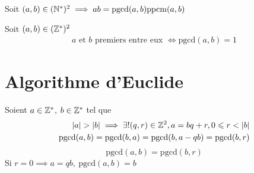 \begin{theoreme}
Soit $(a, b) \in (\mathbb{N}^*)^2 \implies ab = \mathrm{pgcd}(a, b)\mathrm{ppcm}(a, b)$
\end{theoreme}

\begin{definition}
	Soit $(a, b) \in (\mathbb{Z}^*)^2$
	\begin{align*}
	a \text{ et } b \text{ premiers entre eux } \iff \mathrm{pgcd}(a, b) = 1
	\end{align*}
\end{definition}

\section{Algorithme d'Euclide}
\begin{proposition}
Soient $a \in \mathbb{Z}^*$, $b \in \mathbb{Z}^*$ tel que 
\begin{align*}
|a| > |b| \implies \exists ! (q, r) \in \mathbb{Z}^2, a = b q + r, 0 \leqslant r < |b| \\
\mathrm{pgcd}(a, b) = \mathrm{pgcd}(b, a) = \mathrm{pgcd}(b, a - qb) = \mathrm{pgcd}(b, r) \\
\end{align*}
\begin{equation*}
\mathrm{pgcd}(a, b) = \mathrm{pgcd}(b, r)
\end{equation*}
Si $r = 0 \implies a = q b,\ \mathrm{pgcd}(a, b) = b$ 
\end{proposition}